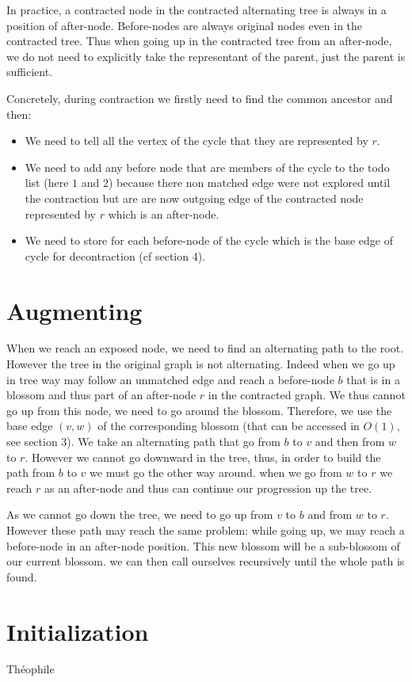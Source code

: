 \documentclass[a4paper,12pt]{article}
\renewcommand{\(}{\left(}
\renewcommand{\)}{\right)}
\begin{document}
In practice, a contracted node in the contracted alternating tree is always in a
position of after-node. Before-nodes are always original nodes even in the
contracted tree. Thus when going up in the contracted tree from an after-node,
we do not need to explicitly take the representant of the parent, just the
parent is sufficient.


Concretely, during contraction we firstly need to find the common ancestor and
then:
\begin{itemize}
\item We need to tell all the vertex of the cycle that they are represented by
  $r$.
\item We need to add any before node that are members of the cycle
to the todo list (here $1$ and $2$) because there non matched edge were not
explored until the contraction but are are now outgoing edge of the contracted
node represented by $r$ which is an after-node.
\item We need to store for each before-node of the cycle which is the base edge
  of cycle for decontraction (cf section 4).
\end{itemize}

\section{Augmenting}

When we reach an exposed node, we need to find an alternating path to the root.
However the tree in the original graph is not alternating. Indeed when we go up
in tree way may follow an unmatched edge and reach a before-node $b$  that is in a
blossom and thus part of an after-node $r$ in the contracted graph. We thus cannot
go up from this node, we need to go around the blossom. Therefore, we use the
base edge $(v,w)$ of the corresponding blossom (that can be accessed in $O(1)$, see
section 3). We take an alternating path that go from $b$ to $v$ and then from
$w$ to $r$. However we cannot go downward in the tree, thus, in order to build
the path from $b$ to $v$ we must go the other way around. when we go from $w$ to
$r$ we reach $r$ as an after-node and thus can continue our progression up the tree.

As we cannot go down the tree, we need to go up from $v$ to $b$ and from $w$ to
$r$. However these path may reach the same problem: while going up, we may reach
a before-node in an after-node position. This new blossom will be a sub-blossom
of our current blossom. we can then call ourselves recursively until the whole
path is found.

\section{Initialization}

Théophile
\end{document}
